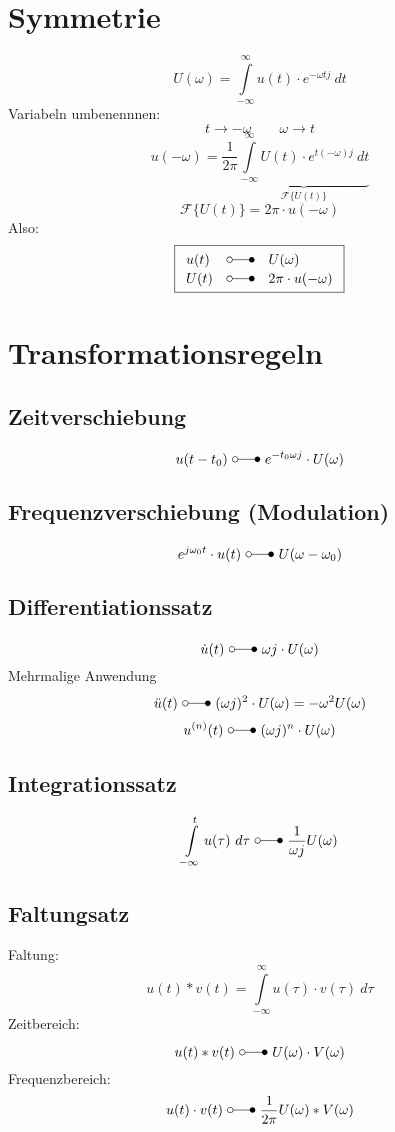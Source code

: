\section{Symmetrie}
\[ U(\omega) = \int\limits_{-\infty}^{\infty} u(t) \cdot e^{-\omega t j} ~ dt \]
Variabeln umbenennnen: 
\[ t \to -\omega \qquad \omega \to t \]
\[ u(-\omega) = \frac{1}{2 \pi} \underbrace{\int\limits_{-\infty}^{\infty} 
U(t) \cdot e^{t (-\omega) j} ~ dt}_{\mathcal{F} \{ U(t) \}} \]
\[ \mathcal{F} \{ U(t) \} = 2 \pi \cdot u(-\omega) \]
Also: 
\[ \boxed{\begin{array}{lll}
u(t) & \laplace & U(\omega)\\
U(t) & \laplace & 2 \pi \cdot u(-\omega)
\end{array}} \]


\section{Transformationsregeln}

\subsection{Zeitverschiebung}
\[ u(t - t_0) ~ \laplace ~ e^{-t_0 \omega j} \cdot U(\omega) \]
\subsection{Frequenzverschiebung (Modulation)}
\[ e^{j\omega_0 t} \cdot u(t) ~\laplace ~U(\omega - \omega_0) \]
\subsection{Differentiationssatz}
\[ \dot{u}(t) ~ \laplace ~ \omega j \cdot U(\omega) \]
Mehrmalige Anwendung
\[ \ddot{u}(t) ~ \laplace ~ (\omega j)^2 \cdot U(\omega) = -\omega^2 U(\omega) \]
\[ u^{(n)}(t) ~ \laplace ~ (\omega j)^n \cdot U(\omega) \]


\subsection{Integrationssatz}
\[\int\limits_{-\infty}^{t} u(\tau) ~ d \tau ~\laplace ~ \frac{1}{\omega j} U(\omega) \]

\subsection{Faltungsatz}
Faltung: 
\[u(t) * v(t) = \int\limits_{-\infty}^{\infty} u(\tau) \cdot v(\tau) ~ d \tau  \]
Zeitbereich: 
\[ u(t) * v(t) ~ \laplace ~ U(\omega) \cdot V(\omega) \]
Frequenzbereich:
\[ u(t) \cdot v(t) ~ \laplace ~ \frac{1}{2 \pi} U(\omega) * V(\omega) \]

